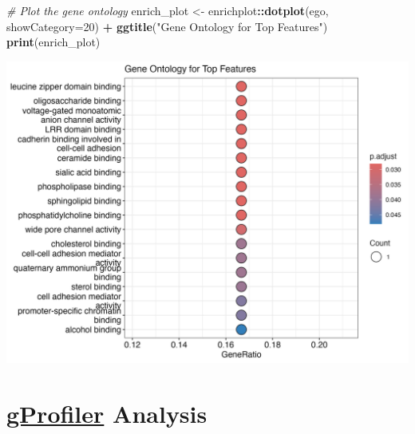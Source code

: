 \documentclass[
]{article}
\newenvironment{Shaded}{\begin{snugshade}}{\end{snugshade}}
\newcommand{\AttributeTok}[1]{\textcolor[rgb]{0.13,0.29,0.53}{#1}}
\newcommand{\CommentTok}[1]{\textcolor[rgb]{0.56,0.35,0.01}{\textit{#1}}}
\newcommand{\DecValTok}[1]{\textcolor[rgb]{0.00,0.00,0.81}{#1}}
\newcommand{\FunctionTok}[1]{\textcolor[rgb]{0.13,0.29,0.53}{\textbf{#1}}}
\newcommand{\NormalTok}[1]{#1}
\newcommand{\OtherTok}[1]{\textcolor[rgb]{0.56,0.35,0.01}{#1}}
\newcommand{\SpecialCharTok}[1]{\textcolor[rgb]{0.81,0.36,0.00}{\textbf{#1}}}
\newcommand{\StringTok}[1]{\textcolor[rgb]{0.31,0.60,0.02}{#1}}
\begin{document}
\begin{Shaded}
\begin{Highlighting}[]
\CommentTok{\# Plot the gene ontology}
\NormalTok{enrich\_plot }\OtherTok{\textless{}{-}}\NormalTok{ enrichplot}\SpecialCharTok{::}\FunctionTok{dotplot}\NormalTok{(ego, }\AttributeTok{showCategory=}\DecValTok{20}\NormalTok{) }\SpecialCharTok{+} 
                                      \FunctionTok{ggtitle}\NormalTok{(}\StringTok{"Gene Ontology for Top Features"}\NormalTok{)}
\FunctionTok{print}\NormalTok{(enrich\_plot)}
\end{Highlighting}
\end{Shaded}

\begin{center}\includegraphics[width=1\linewidth]{images/demo_enrich_plot} \end{center}

\hypertarget{gprofiler-analysis}{%
\section{\texorpdfstring{\href{https://biit.cs.ut.ee/gprofiler/gost}{gProfiler}
Analysis}{gProfiler Analysis}}\label{gprofiler-analysis}}
\end{document}
